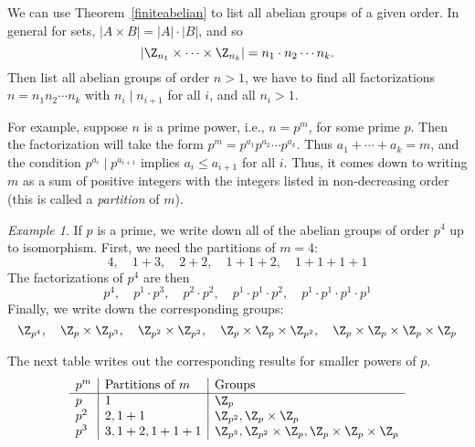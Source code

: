 \documentclass[12pt]{amsart}
\theoremstyle{plain}
\theoremstyle{definition}
\theoremstyle{remark}
\newtheorem*{exam}{Example}
\begin{document}
We can use Theorem~\ref{finiteabelian} to list all abelian groups of a
given order.  In general for sets, $|A\times B|=|A|\cdot|B|$, and so
\[ |\Z_{n_1}\times\cdots\times \Z_{n_k}| = n_1\cdot n_2 \cdots n_k .\]
Then list all abelian groups of order $n>1$, we have to find all factorizations
$n=n_1n_2\cdots n_k$ with $n_i\mid n_{i+1}$ for all $i$, and all $n_i>1$.

For example, suppose $n$ is a prime power, i.e., $n=p^m$, for some prime $p$.  
Then the factorization will
take the form $p^m = p^{a_1}p^{a_2}\cdots p^{a_k}$.  Thus $a_1+\cdots+a_k = m$,
and the condition $p^{a_i}\mid p^{a_{i+1}}$ implies $a_i\leq a_{i+1}$ for all $i$.
Thus, it comes down to writing $m$ as a sum of positive integers with the
integers listed in non-decreasing order (this is called a {\em partition} of $m$).

\begin{exam}
  If $p$ is a prime, we write down all of the abelian groups of order $p^4$ up to
  isomorphism.  First, we need the partitions of $m=4$:
\[ 4,\quad 1+3,\quad 2+2,\quad 1+1+2,\quad 1+1+1+1\]
  The factorizations of $p^4$ are then
\[ p^4,\quad p^1\cdot p^3,\quad p^2\cdot p^2,\quad p^1\cdot p^1\cdot p^2,
\quad p^1\cdot p^1\cdot p^1\cdot p^1\]
  Finally, we write down the corresponding groups:
\[ \Z_{p^4},\quad \Z_p\times \Z_{p^3},\quad \Z_{p^2}\times\Z_{p^2},\quad 
\Z_p\times\Z_p\times \Z_{p^2},\quad \Z_p\times\Z_p\times\Z_p\times\Z_p\]
\end{exam}

The next table writes out the corresponding results for smaller powers of $p$.
\[ \begin{array}{l|l|l}
p^m & \text{Partitions of $m$} & \text{Groups} \\ \hline
p & 1 &\Z_p \\
p^2 & 2, 1+1 &\Z_{p^2}, \Z_p\times \Z_p \\
p^3 & 3, 1+2, 1+1+1 &\Z_{p^3}, \Z_{p^2}\times\Z_p, \Z_p\times \Z_p\times\Z_p
\end{array} \]
\end{document}
